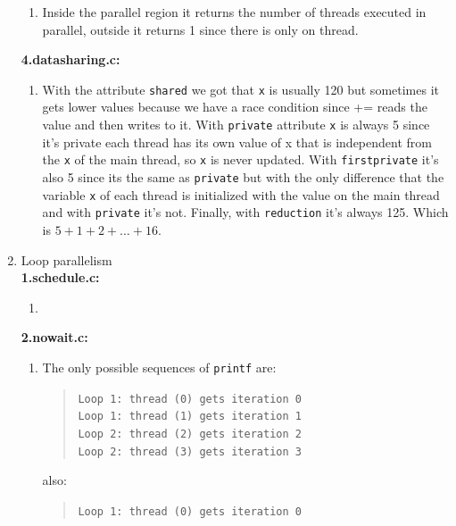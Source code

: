 \begin{enumerate}[label=\Alph*)]
\begin{enumerate}[label=\arabic*.]
        \item Inside the parallel region it returns the number of threads executed in parallel, outside it
        returns 1 since there is only on thread.
    \end{enumerate}
    \textbf{4.datasharing.c:}
    \begin{enumerate}[label=\arabic*.]
        \item With the attribute \texttt{shared} we got that \texttt{x} is usually 120 but sometimes it gets lower values because we have a race condition since += reads the value and then writes to it.
        With \texttt{private} attribute \texttt{x} is always 5 since it's private each thread has its own value of x
        that is independent from the \texttt{x} of the main thread, so \texttt{x} is never updated.
        With \texttt{firstprivate} it's also 5 since its the same as \texttt{private} but with the only difference that the variable \texttt{x} of
        each thread is initialized with the value on the main thread and with \texttt{private} it's not.
        Finally, with \texttt{reduction} it's always 125. Which is $5 + 1 + 2 + \dots + 16$.
    \end{enumerate}
    \item Loop parallelism \\
    \textbf{1.schedule.c:}
    \begin{enumerate}[label=\arabic*.]
        \item  %
    \end{enumerate}
    \textbf{2.nowait.c:}
    \begin{enumerate}[label=\arabic*.]
        \item The only possible sequences of \texttt{printf} are: %
        \begin{quote}
            \texttt{Loop 1: thread (0) gets iteration 0 \\
            Loop 1: thread (1) gets iteration 1 \\
            Loop 2: thread (2) gets iteration 2 \\
            Loop 2: thread (3) gets iteration 3}
        \end{quote}
        also:
        \begin{quote}
            \texttt{Loop 1: thread (0) gets iteration 0 \\
}
\end{quote}
\end{enumerate}
\end{enumerate}
